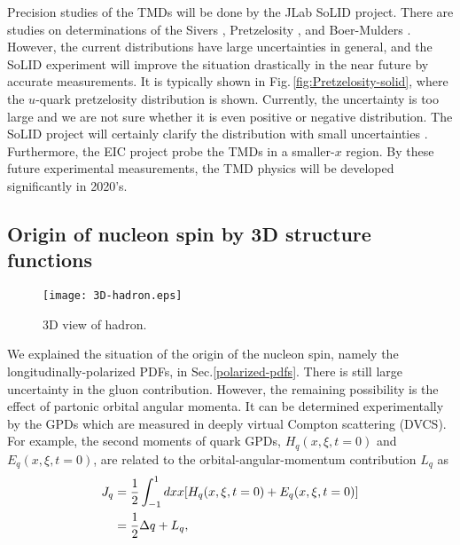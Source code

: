 \documentclass{PoS}
\begin{document}
Precision studies of the TMDs will be done by the JLab SoLID project.
There are studies on determinations of the Sivers \cite{tmd-sivers}, 
Pretzelosity \cite{tmd-pretz}, and Boer-Mulders \cite{tmd-bm}.
However, the current distributions have large uncertainties in general, 
and the SoLID experiment will improve the situation drastically 
in the near future by accurate measurements. It is typically shown in 
Fig.\,\ref{fig:Pretzelosity-solid}, where the $u$-quark
pretzelosity distribution is shown. Currently, the uncertainty
is too large and we are not sure whether it is even positive or negative
distribution. The SoLID project will certainly clarify the distribution
with small uncertainties \cite{Pretzelosity-solid}. 
Furthermore, the EIC project probe the TMDs in a smaller-$x$ region. 
By these future experimental measurements, the TMD physics will be
developed significantly in 2020's.

\subsection{Origin of nucleon spin by 3D structure functions}
\label{n-spin}

\begin{wrapfigure}[8]{r}{0.32\textwidth}
   \vspace{-0.6cm} 
   \begin{center}
     \texttt{[image: 3D-hadron.eps]}
\vspace{-0.20cm}
\caption{3D view of hadron.}
\label{fig:3D-hadron}
   \end{center}
\end{wrapfigure}

We explained the situation of the origin of the nucleon spin, namely
the longitudinally-polarized PDFs, in Sec.\ref{polarized-pdfs}.
There is still large uncertainty in the gluon contribution. 
However, the remaining possibility is the effect of
partonic orbital angular momenta. It can be determined experimentally
by the GPDs which are measured in deeply virtual Compton scattering (DVCS).
For example, the second moments of quark GPDs, 
$H_q (x,\xi,t=0)$ and $E_q (x,\xi,t=0)$,
are related to the orbital-angular-momentum contribution $L_q$ as
\begin{align}
J_q & = \frac{1}{2} \int_{-1}^1 dx x [ H_q (x,\xi,t=0) + E_q (x,\xi,t=0) ]
\nonumber \\
 & = \frac{1}{2} \Delta q + L_q ,
\vspace{-0.20cm}
\nonumber
\label{eqn:oam}
\end{align}
\end{document}
